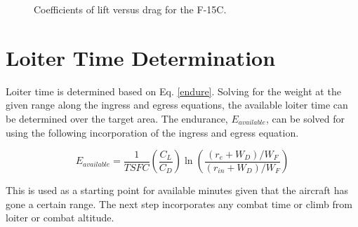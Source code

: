 \begin{figure}%
    \centering
    \qquad
    \caption{Coefficients of lift versus drag for the F-15C.}%
    \label{fig:machSpeedByGroup}%
\end{figure}
\section{Loiter Time Determination}
Loiter time is determined based on Eq. \ref{endure}. Solving for the weight at the given range along the ingress and egress equations, the available loiter time can be determined over the target area. The endurance, $E_{available}$, can be solved for using the following incorporation of the ingress and egress equation.

\begin{equation}
    E_{available} = \dfrac{1}{TSFC}\left(\dfrac{C_L}{C_D}\right)\ln\left(\dfrac{(r_e+ W_D)/W_F}{(r_{in}+W_D)/W_F}\right)
\end{equation}

This is used as a starting point for available minutes given that the aircraft has gone a certain range. The next step incorporates any combat time or climb from loiter or combat altitude. 

